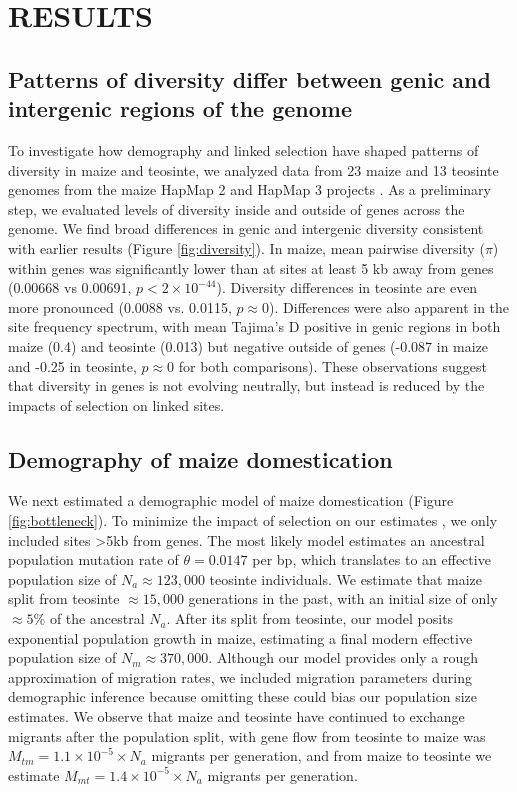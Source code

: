 \documentclass[12pt,a4paper]{article}
\begin{document}
\section*{RESULTS}

\subsection*{Patterns of diversity differ between genic and  intergenic regions of the genome} %
To investigate how demography and linked selection have shaped patterns of diversity in maize and teosinte, we analyzed data from 23 maize and 13 teosinte genomes from the maize HapMap 2 and HapMap 3 projects \cite{chia2012, bukowski2015}. As a preliminary step, we evaluated levels of diversity inside and outside of genes across the genome. We find broad differences in genic and intergenic diversity consistent with earlier results  \cite{hufford2012}(Figure \ref{fig:diversity}).  In maize, mean pairwise diversity ($\pi$) within genes was significantly lower than at sites at least 5 kb away from genes (0.00668 vs 0.00691, $p<2\times 10^{-44}$). 
Diversity differences in teosinte are even more pronounced (0.0088 vs. 0.0115, $p\approx 0$). 
Differences were also apparent in the site frequency spectrum, with mean Tajima's D positive in genic regions in both maize (0.4) and teosinte (0.013) but negative outside of genes (-0.087 in maize and -0.25 in teosinte, $p\approx 0$ for both comparisons).
These observations suggest that diversity in genes is not evolving neutrally, but instead is reduced by the impacts of selection on linked sites. 



\subsection*{Demography of maize domestication} %
We next estimated a demographic model of maize domestication (Figure \ref{fig:bottleneck}). 
To minimize the impact of selection on our estimates \cite{ewing2016}, we only included sites \textgreater 5kb from genes.  
The most likely model estimates an ancestral population mutation rate of $\theta=0.0147$ per bp, which translates to an effective population size of $N_a \approx 123,000$ teosinte individuals.
We estimate that maize split from teosinte $\approx 15,000$ generations in the past, with an initial size of only $\approx 5\% $ of the ancestral $N_a$. 
After its split from teosinte, our model posits exponential population growth in maize, estimating a final modern effective population size of $N_m \approx 370,000$.
Although our model provides only a rough approximation of migration rates, we included migration parameters during demographic inference because omitting these could bias our population size estimates. 
We observe that maize and teosinte have continued to exchange migrants after the population split, with gene flow from teosinte to maize was $M_{tm} =  1.1 \times 10^{-5} \times N_a $  migrants per generation, and from maize to teosinte we estimate $M_{mt} =  1.4 \times 10^{-5} \times N_a$ migrants per generation. 
\end{document}
